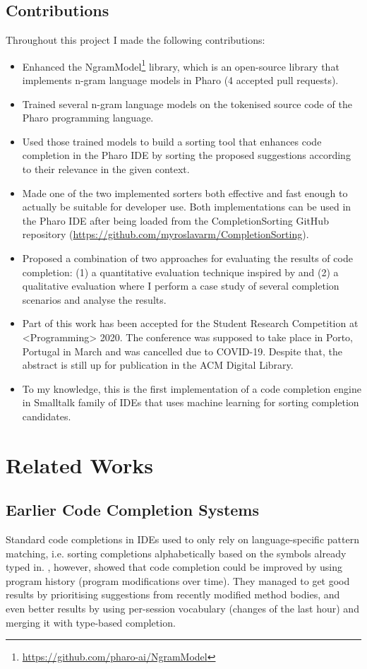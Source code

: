\documentclass[sigplan,screen]{acmart}
\begin{document}
\subsection{Contributions}
Throughout this project I made the following contributions:
\begin{itemize}
    \item Enhanced the NgramModel\footnote{\url{https://github.com/pharo-ai/NgramModel}} library, which is an open-source library that implements n-gram language models in Pharo (4 accepted pull requests).
    \item Trained several n-gram language models on the tokenised source code of the Pharo programming language.
    \item Used those trained models to build a sorting tool that enhances code completion in the Pharo IDE by sorting the proposed suggestions according to their relevance in the given context.
    \item Made one of the two implemented sorters both effective and fast enough to actually be suitable for developer use. Both implementations can be used in the Pharo IDE after being loaded from the CompletionSorting GitHub repository (\url{https://github.com/myroslavarm/CompletionSorting}).
    \item Proposed a combination of two approaches for evaluating the results of code completion: (1) a quantitative evaluation technique inspired by \cite{Robb08a} and (2) a qualitative evaluation where I perform a case study of several completion scenarios and analyse the results.
    \item Part of this work has been accepted for the Student Research Competition at <Programming> 2020. The conference was supposed to take place in Porto, Portugal in March and was cancelled due to COVID-19. Despite that, the abstract is still up for publication in the ACM Digital Library.
    \item To my knowledge, this is the first implementation of a code completion engine in Smalltalk family of IDEs that uses machine learning for sorting completion candidates.
\end{itemize}

\section{Related Works}
\subsection{Earlier Code Completion Systems}
Standard code completions in IDEs used to only rely on language-specific pattern matching, i.e. sorting completions alphabetically based on the symbols already typed in. \cite{Robb08a}, however, showed that code completion could be improved by using program history (program modifications over time). They managed to get good results by prioritising suggestions from recently modified method bodies, and even better results by using per-session vocabulary (changes of the last hour) and merging it with type-based completion.
\end{document}
